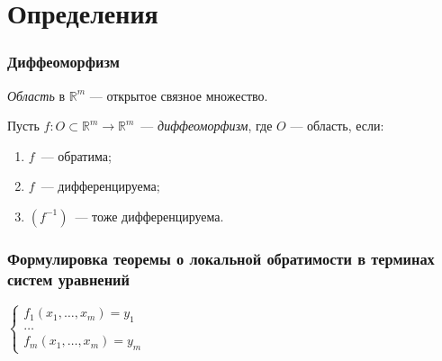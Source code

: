 \documentclass{article}
\begin{document}
\newcommand{\RM}[0]{\mathbb{R}^m}
\newcommand{\dist}[0]{\mathrm{dist} $\ $}
\newcommand{\rang}[0]{\mathrm{rang} $\ $}
\newcommand{\grad}[0]{\mathrm{grad} $\ $}
\newcommand{\Lin}[0]{\mathrm{Lin} $\ $}

\tableofcontents

\newpage 

\part{Определения}

    \newpage

    \section{Диффеоморфизм}
    
        \textit{Область} в $\RM$ --- открытое связное множество.
        
        Пусть $f : O \subset \RM \rightarrow \RM$~--- \textit{диффеоморфизм}, где $O$ --- область, если:
        
        \begin{enumerate}
        
            \item $f$~--- обратима;
            
            \item $f$~--- дифференцируема;
            
            \item $(f^{-1})$~--- тоже дифференцируема.
            
        \end{enumerate}
        
    \newpage
    
    \section{Формулировка теоремы о локальной обратимости в терминах систем уравнений}
    
    $
            \begin{cases}
            
                f_1(x_1, \ldots, x_m) = y_1 \\
                
                \ldots \\
                
                f_m(x_1, \ldots, x_m) = y_m
            
            \end{cases}
    $
        
\end{document}
